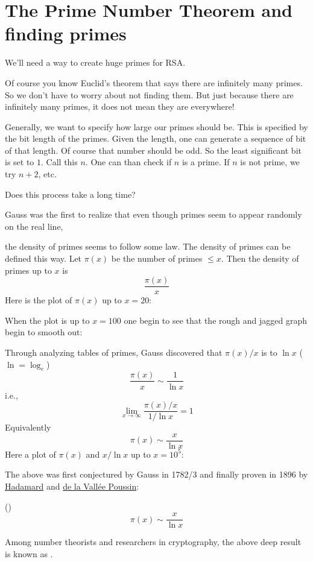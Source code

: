 \section{The Prime Number Theorem and finding primes}

We'll need a way to create huge primes for RSA.

Of course you know Euclid's theorem that says
there are infinitely many primes.
So we don't have to worry about not finding them.
But just because there are infinitely many primes, it does not mean
they are everywhere!

Generally, we want to specify how large our primes should be.
This is specified by the bit length of the primes.
Given the length, one can generate a sequence of bit of that length.
Of course that number should be odd.
So the least significant bit is set to $1$.
Call this $n$.
One can than check if $n$ is a prime.
If $n$ is not prime, we try $n + 2$, etc.

Does this process take a long time?

Gauss was the first to realize that even though primes seem to appear
randomly on the real line,

the density of primes seems to follow some
law.
The density of primes can be defined this way.
Let $\pi(x)$ be the number of primes $\leq x$.
Then the density of primes up to $x$ is
\[
\frac{\pi(x)}{x}
\]
Here is the plot of $\pi(x)$ up to $x = 20$:

When the plot is up to $x = 100$ one begin to see that the
rough and jagged graph begin to smooth out:


Through analyzing tables of primes, Gauss discovered that
$\pi(x)/x$ is  to $\ln x$ ($\ln = \log_e$)
\[
\frac{\pi(x)}{x} \sim \frac{1}{\ln x}
\]
i.e.,
\[
\lim_{x \rightarrow \infty} \frac{\pi(x)/x}{1/\ln x} = 1
\]
Equivalently
\[
\pi(x) \sim \frac{x}{\ln x}
\]
Here a plot of $\pi(x)$ and $x/\ln x$ up to $x = 10^5$:


The above was first conjectured by Gauss in 1782/3
and finally proven in 1896 by
\href{https://en.wikipedia.org/wiki/Jacques_Hadamard}{Hadamard}
and
\href{https://en.wikipedia.org/wiki/Charles_Jean_de_la_Vall%C3%A9e_Poussin}{de la Vallée Poussin}:

\begin{thm} \textnormal{()}
\[
\pi(x) \sim \frac{x}{\ln x}
\]  
\end{thm}

Among number theorists and researchers in cryptography,
the above deep result is known as .


